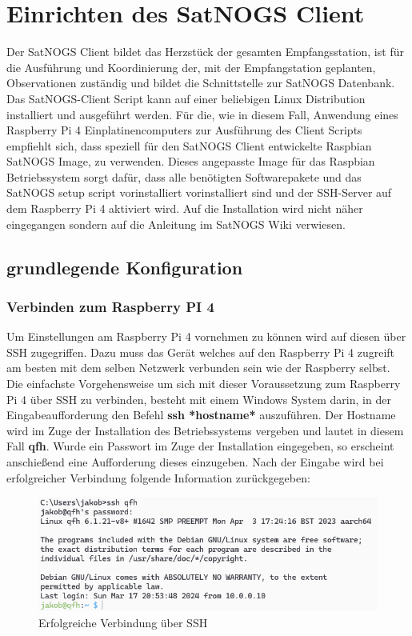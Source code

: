 \chapter{Einrichten des SatNOGS Client}
\label{chap:gs-setup}
Der SatNOGS Client bildet das Herzstück der gesamten Empfangsstation, ist für die Ausführung und Koordinierung der, mit der Empfangstation geplanten, Observationen zuständig und bildet die Schnittstelle zur SatNOGS Datenbank. Das SatNOGS-Client Script kann auf einer beliebigen Linux Distribution installiert und ausgeführt werden. Für die, wie in diesem Fall, Anwendung eines Raspberry Pi 4  Einplatinencomputers zur Ausführung des Client Scripts empfiehlt sich, dass speziell für den SatNOGS Client entwickelte Raspbian SatNOGS Image, zu verwenden. Dieses angepasste Image für das Raspbian Betriebssystem sorgt dafür, dass alle benötigten Softwarepakete und das SatNOGS setup script vorinstalliert vorinstalliert sind und der SSH-Server auf dem Raspberry Pi 4 aktiviert wird. Auf die Installation wird nicht näher eingegangen sondern auf die Anleitung im SatNOGS Wiki \cite{noauthor_raspberry_nodate} verwiesen. 

\section{grundlegende Konfiguration}
\subsection{Verbinden zum Raspberry PI 4}
Um Einstellungen am Raspberry Pi 4 vornehmen zu können wird auf diesen über SSH zugegriffen. Dazu muss das Gerät welches auf den Raspberry Pi 4 zugreift am besten mit dem selben Netzwerk verbunden sein wie der Raspberry selbst. Die einfachste Vorgehensweise um sich mit dieser Voraussetzung zum Raspberry Pi 4 über SSH zu verbinden, besteht mit einem Windows System darin, in der Eingabeaufforderung den Befehl \textbf{ssh *hostname*} auszuführen. Der Hostname wird im Zuge der Installation des Betriebssystems vergeben und lautet in diesem Fall \textbf{qfh}. Wurde ein Passwort im Zuge der Installation eingegeben, so erscheint anschießend eine Aufforderung dieses einzugeben. Nach der Eingabe wird bei erfolgreicher Verbindung folgende Information zurückgegeben:

\begin{figure} [H]
	\centering
	\includegraphics[width=\linewidth]{../ref/successfull_login.png}
	\caption{Erfolgreiche Verbindung über SSH}
	\label{fig:htrl-uhf(test)successfulllogin}
\end{figure}

